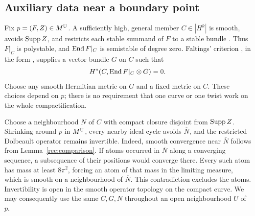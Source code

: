 \subsection{Auxiliary data near a boundary point}
Fix $p=(F,Z)\in M^{\mathrm U}$. A sufficiently high, general member $C\in|H^k|$
is smooth, avoids $\operatorname{Supp} Z$, and restricts each stable summand of $F$
to a stable bundle \cite{MR84}. Thus $F|_C$ is polystable, and
$\operatorname{End} F|_C$ is semistable of degree zero. Faltings' criterion \cite[Theorem~1.2]{Falt93}, in the form
\cite[Theorem~1.1]{BH08}, supplies a vector bundle $G$ on $C$ such that
\begin{equation}\label{eq:acyclic-limit}
 H^*(C,\operatorname{End} F|_C\otimes G)=0.
\end{equation}
Choose any smooth Hermitian metric on $G$ and a fixed metric on $C$.
These choices depend on $p$; there is no requirement that one curve or one
twist work on the whole compactification.

Choose a neighbourhood $N$ of $C$ with compact closure disjoint from
$\operatorname{Supp} Z$. Shrinking around $p$ in $M^{\mathrm U}$, every nearby ideal cycle avoids
$\overline N$, and the restricted Dolbeault operator remains invertible.
Indeed, smooth convergence near $\overline N$ follows from
Lemma~\ref{rec:comparison}. If atoms occurred in $\overline N$ along a converging sequence, a
subsequence of their positions would converge there. Every such atom has
mass at least $8\pi^2$, forcing an atom of that mass in the limiting
measure, which is smooth on a neighbourhood of $\overline N$. This
contradiction excludes the atoms.
Invertibility is open in the smooth operator topology on the compact curve.
We may consequently use the same $C,G,N$ throughout an open neighbourhood
$U$ of $p$.

